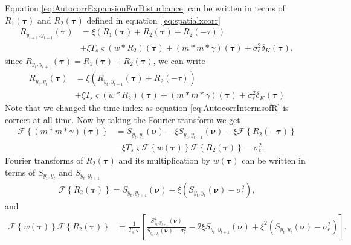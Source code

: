 \documentclass[]{article}
\begin{document}
Equation \ref{eq:AutocorrExpansionForDisturbance} can be written in terms of $R_1\left(\boldsymbol\tau\right)$ and $R_2\left(\boldsymbol\tau\right)$ defined in equation~\ref{eq:spatialxcorr}
\begin{align}
R_{y_{t+1},y_{t+1}}(\boldsymbol{\tau}) &=\xi \left(R_1\left(\boldsymbol\tau\right)+ R_2\left(\boldsymbol\tau\right)+R_2\left(\boldsymbol-\tau\right)\right) \nonumber \\
&+\xi T_s \varsigma\left(w\ast R_2\right)\left(\boldsymbol\tau\right)+\left(m\ast m \ast \gamma\right)\left(\boldsymbol\tau\right)+\sigma_{\epsilon}^2\delta_{K}\left(\boldsymbol\tau\right),\label{eq:AutocorrIntermsofR}
\end{align}
 since $R_{y_{t},y_{t+1}}(\boldsymbol{\tau})=R_1\left(\boldsymbol\tau\right)+ R_2\left(\boldsymbol\tau\right)$, we can write
\begin{align}
R_{y_{t},y_{t}}(\boldsymbol{\tau}) &=\xi \left(R_{y_{t},y_{t+1}}(\boldsymbol{\tau})+R_2\left(\boldsymbol-\tau\right)\right) \nonumber \\
&+\xi T_s \varsigma\left(w\ast R_2\right)\left(\boldsymbol\tau\right)+\left(m\ast m \ast \gamma\right)\left(\boldsymbol\tau\right)+\sigma_{\epsilon}^2\delta_{K}\left(\boldsymbol\tau\right)
\end{align}
Note that we changed the time index as equation \ref{eq:AutocorrIntermsofR} is correct at all time. Now by taking the Fourier transform we get
\begin{align}
 \mathcal{F}\left\{\left(m\ast m\ast \gamma\right)\left(\boldsymbol\tau\right)\right\}&=S_{y_{t},y_{t}}\left(\boldsymbol\nu\right)-\xi S_{y_{t},y_{t+1}}\left(\boldsymbol\nu\right)-\xi \mathcal{F}\left\{R_2\left(-\boldsymbol\tau\right)\right\} \nonumber\\
&-\xi T_s \varsigma  \mathcal{F}\left\{w\left(\boldsymbol\tau\right)\right\}\mathcal{F}\left\{R_2\left(\boldsymbol\tau\right)\right\}-\sigma_{\epsilon}^2. \label{eq:SensorsConvgamma}
\end{align}
Fourier transforms of $R_2\left(\boldsymbol\tau\right)$ and its multiplication by  $w\left(\boldsymbol\tau\right)$ can be written in terms of $S_{y_{t},y_{t}}$ and $S_{y_{t},y_{t+1}}$
\begin{align}
 \mathcal{F}\left\{R_2\left(\boldsymbol\tau\right)\right\}=S_{y_{t},y_{t+1}}\left(\boldsymbol\nu\right)-\xi \left(S_{y_{t},y_{t}}\left(\boldsymbol\nu\right)-\sigma_{\epsilon}^2\right),
\end{align}
and
\begin{align}
 \mathcal{F}\left\{w\left(\boldsymbol\tau\right)\right\}\mathcal{F}\left\{R_2\left(\boldsymbol\tau\right)\right\}&=\frac{1}{T_s \varsigma}\left[\frac{S_{y_{t},y_{t+1}}^2\left(\boldsymbol\nu\right)}{S_{y_{t},y_{t}}\left(\boldsymbol\nu\right)-\sigma_{\epsilon}^2}-2\xi S_{y_{t},y_{t+1}}\left(\boldsymbol\nu\right)+\xi^2\left(S_{y_{t},y_{t}}\left(\boldsymbol\nu\right)-\sigma_{\epsilon}^2\right)\right].
\end{align}
\end{document}
